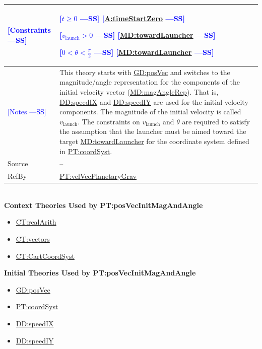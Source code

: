 \documentclass[12pt]{article}
\newcommand{\authornote}[3]{\textcolor{#1}{[#3 ---#2]}}
\newcommand{\authornote}[3]{}
\newcommand{\wss}[1]{\authornote{blue}{SS}{#1}}
\begin{document}
\begin{minipage}{\textwidth}
\begin{tabular}{>{\raggedright}p{}>{\raggedright\arraybackslash}p{}}
\\ \midrule
\wss{Constraints} & 
\begin{symbDescription}
\item \wss{$t \geq 0$} \wss{\hyperref[timeStartZero]{A:timeStartZero}}
\item \wss{$v_\text{launch} > 0$} \wss{\hyperref[MD:towardLauncher]{MD:towardLauncher}}
\item \wss{$
0 < \theta < \frac{\pi}{2}$} \wss{\hyperref[MD:towardLauncher]{MD:towardLauncher}}
\end{symbDescription}

\\ \midrule \wss{Notes} & This theory starts with
\hyperref[GD:posVec]{GD:posVec} and switches to the magnitude/angle
representation for the components of the initial velocity vector
(\hyperref[MD:magAngleRep]{MD:magAngleRep}).  That is,
\hyperref[DD:speedIX]{DD:speedIX} and \hyperref[DD:speedIY]{DD:speedIY} are used
for the initial velocity components. The magnitude of the initial velocity is
called $v_\text{launch}$.  The constraints on $v_\text{launch}$ and $\theta$ are
required to satisfy the assumption that the launcher must be aimed toward the
target \hyperref[MD:towardLauncher]{MD:towardLauncher} for the coordinate system
defined in \hyperref[PT:coordSyst]{PT:coordSyst}.

\\ \midrule
Source & --
         
\\ \midrule
RefBy & \hyperref[PT:velVecPlanetaryGrav]{PT:velVecPlanetaryGrav}

\\ \bottomrule
\end{tabular}
\end{minipage}
~\\

\noindent \textbf{Context Theories Used by PT:posVecInitMagAndAngle}

\begin{itemize}
\item \hyperref[CT:realArith]{CT:realArith}
\item \hyperref[CT:vectors]{CT:vectors}
\item \hyperref[CT:CartCoordSyst]{CT:CartCoordSyst}
\end{itemize}

\noindent \textbf{Initial Theories Used by PT:posVecInitMagAndAngle}

\begin{itemize}
\item \hyperref[GD:posVec]{GD:posVec}
\item \hyperref[PT:coordSyst]{PT:coordSyst}
\item \hyperref[DD:speedIX]{DD:speedIX}
\item \hyperref[DD:speedIY]{DD:speedIY}
\end{itemize}
\end{document}

